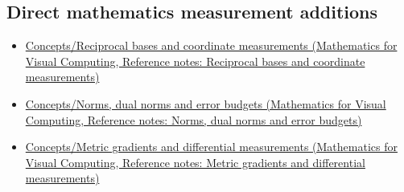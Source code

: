 \subsection{Direct mathematics measurement additions}\label{appendix-a6d556a4ef50-direct-mathematics-measurement-additions}

\begin{itemize}
\tightlist
\item
  \href{../02-Mathematics-for-Visual-Computing/main.pdf\#nameddest=appendix-6b3d696dd902}{Concepts/Reciprocal bases and coordinate measurements (Mathematics for Visual Computing, Reference notes: Reciprocal bases and coordinate measurements)}
\item
  \href{../02-Mathematics-for-Visual-Computing/main.pdf\#nameddest=appendix-d6d9dbbe3c14}{Concepts/Norms, dual norms and error budgets (Mathematics for Visual Computing, Reference notes: Norms, dual norms and error budgets)}
\item
  \href{../02-Mathematics-for-Visual-Computing/main.pdf\#nameddest=appendix-f4acdb1d5563}{Concepts/Metric gradients and differential measurements (Mathematics for Visual Computing, Reference notes: Metric gradients and differential measurements)}
\end{itemize}
